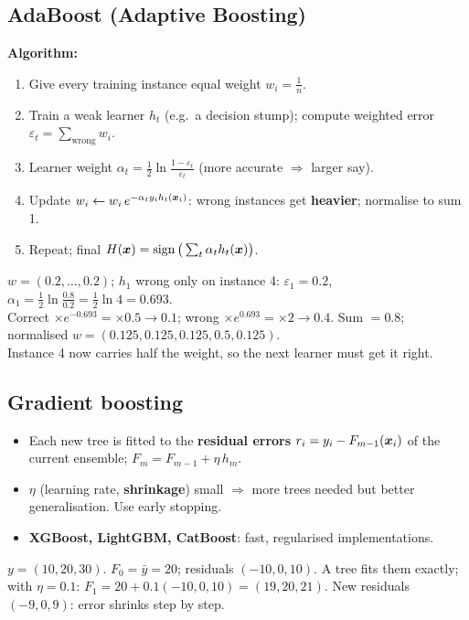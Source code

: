 \subsection{AdaBoost (Adaptive Boosting)}
\textbf{Algorithm:}
\begin{enumerate}
  \item Give every training instance equal weight $w_i=\frac1n$.
  \item Train a weak learner $h_t$ (e.g.\ a decision stump); compute weighted error $\varepsilon_t=\sum_{\text{wrong}}w_i$.
  \item Learner weight $\alpha_t=\frac12\ln\frac{1-\varepsilon_t}{\varepsilon_t}$ (more accurate $\Rightarrow$ larger say).
  \item Update $w_i\leftarrow w_i\,e^{-\alpha_ty_ih_t(\boldsymbol{x}_i)}$: wrong instances get \textbf{heavier}; normalise to sum 1.
  \item Repeat; final $H(\boldsymbol{x})=\operatorname{sign}\big(\sum_t\alpha_th_t(\boldsymbol{x})\big)$.
\end{enumerate}
\begin{numer}
$w=(0.2,\dots,0.2)$; $h_1$ wrong only on instance 4: $\varepsilon_1=0.2$, $\alpha_1=\frac12\ln\frac{0.8}{0.2}=\frac12\ln4=\mathbf{0.693}$.\\
Correct $\times e^{-0.693}=\times0.5\to0.1$; wrong $\times e^{0.693}=\times2\to0.4$. Sum $=0.8$; normalised $w=(0.125,0.125,0.125,\mathbf{0.5},0.125)$.\\
Instance 4 now carries half the weight, so the next learner must get it right.
\end{numer}

\subsection{Gradient boosting}
\begin{itemize}
  \item Each new tree is fitted to the \textbf{residual errors} $r_i=y_i-F_{m-1}(\boldsymbol{x}_i)$ of the current ensemble; $F_m=F_{m-1}+\eta\,h_m$.
  \item $\eta$ (learning rate, \textbf{shrinkage}) small $\Rightarrow$ more trees needed but better generalisation. Use early stopping.
  \item \textbf{XGBoost, LightGBM, CatBoost}: fast, regularised implementations.
\end{itemize}
\begin{numer}
$y=(10,20,30)$. $F_0=\bar y=20$; residuals $(-10,0,10)$. A tree fits them exactly; with $\eta=0.1$: $F_1=20+0.1(-10,0,10)=(19,20,21)$. New residuals $(-9,0,9)$: error shrinks step by step.
\end{numer}

